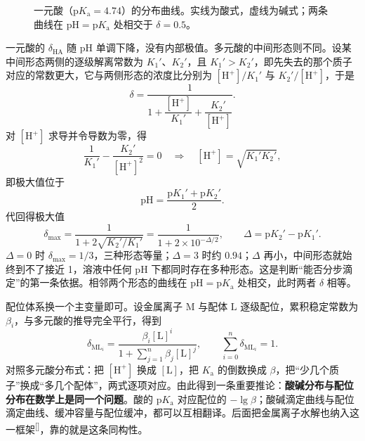 \documentclass[UTF8]{ctexbook}
\begin{document}
\begin{figure}[H]
\centering
{}
\caption{一元酸（\(\mathrm{p}K_{\mathrm{a}}=4.74\)）的分布曲线。实线为酸式，虚线为碱式；两条曲线在 \(\mathrm{pH}=\mathrm{p}K_{\mathrm{a}}\) 处相交于 \(\delta=0.5\)。}
\label{fig:delta-mono}
\end{figure}

一元酸的 \(\delta_{\mathrm{HA}}\) 随 \(\mathrm{pH}\) 单调下降，没有内部极值。多元酸的中间形态则不同。设某中间形态两侧的逐级解离常数为 \(K_1'\)、\(K_2'\)，且 \(K_1'>K_2'\)，即先失去的那个质子对应的常数更大，它与两侧形态的浓度比分别为 \([\mathrm{H^+}]/K_1'\) 与 \(K_2'/[\mathrm{H^+}]\)，于是
\[
\delta=\frac{1}{1+\dfrac{[\mathrm{H^+}]}{K_1'}+\dfrac{K_2'}{[\mathrm{H^+}]}} .
\]
对 \([\mathrm{H^+}]\) 求导并令导数为零，得
\[
\frac{1}{K_1'}-\frac{K_2'}{[\mathrm{H^+}]^2}=0
\quad\Longrightarrow\quad
[\mathrm{H^+}]=\sqrt{K_1'K_2'},
\]
即极大值位于
\[
\mathrm{pH}=\frac{\mathrm{p}K_1'+\mathrm{p}K_2'}{2}.
\]
代回得极大值
\[
\delta_{\max}=\frac{1}{1+2\sqrt{K_2'/K_1'}}
=\frac{1}{1+2\times10^{-\Delta/2}},
\qquad \Delta=\mathrm{p}K_2'-\mathrm{p}K_1' .
\]
\(\Delta=0\) 时 \(\delta_{\max}=1/3\)，三种形态等量；\(\Delta=3\) 时约 \(0.94\)；\(\Delta\) 再小，中间形态就始终到不了接近 1，溶液中任何 \(\mathrm{pH}\) 下都同时存在多种形态。这是判断“能否分步滴定”的第一条依据。相邻两个形态的曲线在 \(\mathrm{pH}=\mathrm{p}K_{\mathrm{a}}\) 处相交，此时两者 \(\delta\) 相等。

配位体系换一个主变量即可。设金属离子 \(\mathrm{M}\) 与配体 \(\mathrm{L}\) 逐级配位，累积稳定常数为 \(\beta_i\)，与多元酸的推导完全平行，得到
\[
\delta_{\mathrm{ML}_i}
=\frac{\beta_i[\mathrm{L}]^i}
{1+\sum_{j=1}^{n}\beta_j[\mathrm{L}]^j},
\qquad
\sum_{i=0}^{n}\delta_{\mathrm{ML}_i}=1 .
\]
对照多元酸分布式：把 \([\mathrm{H^+}]\) 换成 \([\mathrm{L}]\)，把 \(K_{\mathrm{a}}\) 的倒数换成 \(\beta\)，把“少几个质子”换成“多几个配体”，两式逐项对应。由此得到一条重要推论：\textbf{酸碱分布与配位分布在数学上是同一个问题}。酸的 \(\mathrm{p}K_{\mathrm{a}}\) 对应配位的 \(-\lg\beta\)；酸碱滴定曲线与配位滴定曲线、缓冲容量与配位缓冲，都可以互相翻译。后面把金属离子水解也纳入这一框架\textsuperscript{[\pageref{sec:metal-acid}]}，靠的就是这条同构性。
\end{document}
